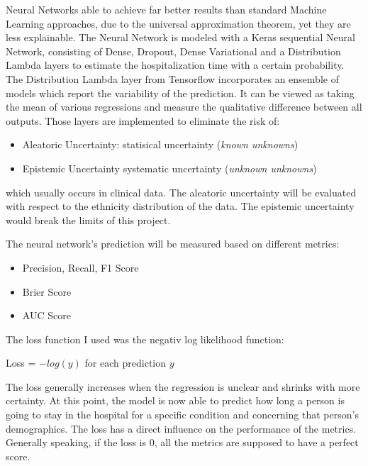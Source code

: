\documentclass[journal]{IEEEtran}
\begin{document}
Neural Networks able to achieve far better results than standard Machine Learning approaches, due to the universal approximation theorem, yet they are less explainable. The Neural Network is modeled with a Keras sequential Neural Network, consisting of Dense, Dropout, Dense Variational and a Distribution Lambda layers to estimate the hospitalization time with a certain probability. The Distribution Lambda layer from Tensorflow incorporates an ensemble of models which report the variability of the prediction. It can be viewed as taking the mean of various regressions and measure the qualitative difference between all outputs. Those layers are implemented to eliminate the risk of: \\

\begin{itemize}
	\item Aleatoric Uncertainty: statisical uncertainty (\textit{known unknowns})
	\item Epistemic Uncertainty systematic uncertainty (\textit{unknown unknowns})\\
\end{itemize}

which usually occurs in clinical data. The aleatoric uncertainty will be evaluated with respect to the ethnicity distribution of the data. The epistemic uncertainty would break the limits of this project.

The neural network's prediction will be measured based on different metrics: \\

\begin{itemize}
	\item Precision, Recall, F1 Score
	\item Brier Score
	\item AUC Score \\
\end{itemize}

The loss function I used was the negativ log likelihood function: 

\begin{center}
	Loss = \(-log(y)\) for each prediction \(y\) \\
\end{center}

The loss generally increases when the regression is unclear and shrinks with more certainty. At this point, the model is now able to predict how long a person is going to stay in the hospital for a specific condition and concerning that person's demographics. The loss has a direct influence on the performance of the metrics. Generally speaking, if the loss is 0, all the metrics are supposed to have a perfect score.
\end{document}
